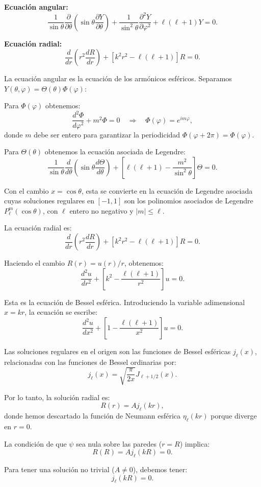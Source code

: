 \documentclass[a4paper]{article}
\begin{document}
\textbf{Ecuación angular:}
$$\frac{1}{\sin\theta}\frac{\partial}{\partial\theta}\left(\sin\theta\frac{\partial Y}{\partial\theta}\right) + \frac{1}{\sin^2\theta}\frac{\partial^2 Y}{\partial\varphi^2} + \ell(\ell+1)Y = 0.$$

\textbf{Ecuación radial:}
$$\frac{d}{dr}\left(r^2\frac{dR}{dr}\right) + [k^2r^2 - \ell(\ell+1)]R = 0.$$


La ecuación angular es la ecuación de los armónicos esféricos. Separamos $Y(\theta,\varphi) = \Theta(\theta)\Phi(\varphi)$:

Para $\Phi(\varphi)$ obtenemos:
$$\frac{d^2\Phi}{d\varphi^2} + m^2\Phi = 0 \quad \Rightarrow \quad \Phi(\varphi) = e^{im\varphi},$$
donde $m$ debe ser entero para garantizar la periodicidad $\Phi(\varphi+2\pi) = \Phi(\varphi)$.

Para $\Theta(\theta)$ obtenemos la ecuación asociada de Legendre:
$$\frac{1}{\sin\theta}\frac{d}{d\theta}\left(\sin\theta\frac{d\Theta}{d\theta}\right) + \left[\ell(\ell+1) - \frac{m^2}{\sin^2\theta}\right]\Theta = 0.$$

Con el cambio $x = \cos\theta$, esta se convierte en la ecuación de Legendre asociada cuyas soluciones regulares en $[-1,1]$ son los polinomios asociados de Legendre $P_\ell^m(\cos\theta)$, con $\ell$ entero no negativo y $|m| \leq \ell$.

La ecuación radial es:
$$\frac{d}{dr}\left(r^2\frac{dR}{dr}\right) + [k^2r^2 - \ell(\ell+1)]R = 0.$$

Haciendo el cambio $R(r) = u(r)/r$, obtenemos:
$$\frac{d^2u}{dr^2} + \left[k^2 - \frac{\ell(\ell+1)}{r^2}\right]u = 0.$$

Esta es la ecuación de Bessel esférica. Introduciendo la variable adimensional $x = kr$, la ecuación se escribe:
$$\frac{d^2u}{dx^2} + \left[1 - \frac{\ell(\ell+1)}{x^2}\right]u = 0.$$

Las soluciones regulares en el origen son las funciones de Bessel esféricas $j_\ell(x)$, relacionadas con las funciones de Bessel ordinarias por:
$$j_\ell(x) = \sqrt{\frac{\pi}{2x}}J_{\ell+1/2}(x).$$

Por lo tanto, la solución radial es:
$$R(r) = A j_\ell(kr),$$
donde hemos descartado la función de Neumann esférica $\eta_\ell(kr)$ porque diverge en $r=0$.

La condición de que $\psi$ sea nula sobre las paredes ($r=R$) implica:
$$R(R) = A j_\ell(kR) = 0.$$

Para tener una solución no trivial ($A \neq 0$), debemos tener:
$$j_\ell(kR) = 0.$$
\end{document}
